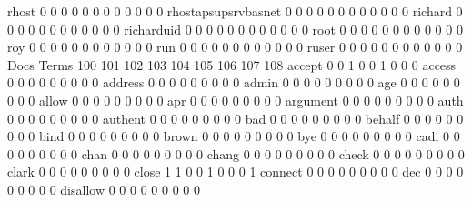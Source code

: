 \documentclass[compress,8pt]{beamer}
\begin{document}
\begin{frame}
\begin{Schunk}
  rhost                                     0  0  0  0  0  0  0  0  0  0  0  0
  rhostapsupsrvbasnet                       0  0  0  0  0  0  0  0  0  0  0  0
  richard                                   0  0  0  0  0  0  0  0  0  0  0  0
  richarduid                                0  0  0  0  0  0  0  0  0  0  0  0
  root                                      0  0  0  0  0  0  0  0  0  0  0  0
  roy                                       0  0  0  0  0  0  0  0  0  0  0  0
  run                                       0  0  0  0  0  0  0  0  0  0  0  0
  ruser                                     0  0  0  0  0  0  0  0  0  0  0  0
                                          Docs
Terms                                      100 101 102 103 104 105 106 107 108
  accept                                     0   0   1   0   0   1   0   0   0
  access                                     0   0   0   0   0   0   0   0   0
  address                                    0   0   0   0   0   0   0   0   0
  admin                                      0   0   0   0   0   0   0   0   0
  age                                        0   0   0   0   0   0   0   0   0
  allow                                      0   0   0   0   0   0   0   0   0
  apr                                        0   0   0   0   0   0   0   0   0
  argument                                   0   0   0   0   0   0   0   0   0
  auth                                       0   0   0   0   0   0   0   0   0
  authent                                    0   0   0   0   0   0   0   0   0
  bad                                        0   0   0   0   0   0   0   0   0
  behalf                                     0   0   0   0   0   0   0   0   0
  bind                                       0   0   0   0   0   0   0   0   0
  brown                                      0   0   0   0   0   0   0   0   0
  bye                                        0   0   0   0   0   0   0   0   0
  cadi                                       0   0   0   0   0   0   0   0   0
  chan                                       0   0   0   0   0   0   0   0   0
  chang                                      0   0   0   0   0   0   0   0   0
  check                                      0   0   0   0   0   0   0   0   0
  clark                                      0   0   0   0   0   0   0   0   0
  close                                      1   1   0   0   1   0   0   0   1
  connect                                    0   0   0   0   0   0   0   0   0
  dec                                        0   0   0   0   0   0   0   0   0
  disallow                                   0   0   0   0   0   0   0   0   0

\end{Schunk}
\end{frame}
\end{document}
